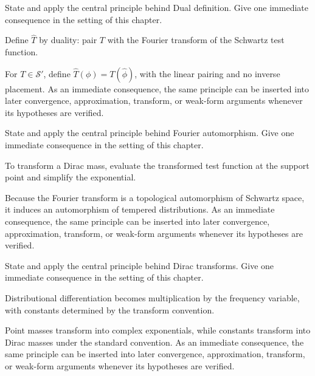 \begin{exercise}\label{exr:iii19-01}
State and apply the central principle behind Dual definition. Give one immediate consequence in the setting of this chapter.
\end{exercise}
\begin{hint}
Define \(\widehat T\) by duality: pair \(T\) with the Fourier transform of the Schwartz test function.
\end{hint}
\begin{solution}
For $T\in\mathcal S'$, define $\widehat T(\phi)=T(\widehat\phi)$, with the linear pairing and no inverse placement. As an immediate consequence, the same principle can be inserted into later convergence, approximation, transform, or weak-form arguments whenever its hypotheses are verified.
\end{solution}

\begin{exercise}\label{exr:iii19-02}
State and apply the central principle behind Fourier automorphism. Give one immediate consequence in the setting of this chapter.
\end{exercise}
\begin{hint}
To transform a Dirac mass, evaluate the transformed test function at the support point and simplify the exponential.
\end{hint}
\begin{solution}
Because the Fourier transform is a topological automorphism of Schwartz space, it induces an automorphism of tempered distributions. As an immediate consequence, the same principle can be inserted into later convergence, approximation, transform, or weak-form arguments whenever its hypotheses are verified.
\end{solution}

\begin{exercise}\label{exr:iii19-03}
State and apply the central principle behind Dirac transforms. Give one immediate consequence in the setting of this chapter.
\end{exercise}
\begin{hint}
Distributional differentiation becomes multiplication by the frequency variable, with constants determined by the transform convention.
\end{hint}
\begin{solution}
Point masses transform into complex exponentials, while constants transform into Dirac masses under the standard convention. As an immediate consequence, the same principle can be inserted into later convergence, approximation, transform, or weak-form arguments whenever its hypotheses are verified.
\end{solution}

